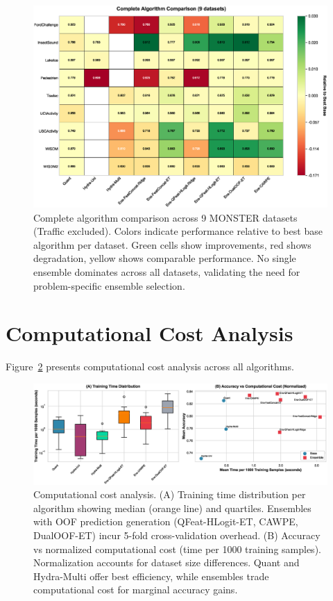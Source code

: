 \documentclass[pdflatex,sn-basic]{sn-jnl}           %
\theoremstyle{thmstyleone}%
\theoremstyle{thmstyletwo}%
\theoremstyle{thmstylethree}%
\begin{document}
\begin{appendices}
\begin{figure}[!htb]
\centering
\includegraphics[width=\textwidth]{figureA1_full_heatmap}
\caption{Complete algorithm comparison across 9 MONSTER datasets (Traffic excluded). Colors indicate performance relative to best base algorithm per dataset. Green cells show improvements, red shows degradation, yellow shows comparable performance. No single ensemble dominates across all datasets, validating the need for problem-specific ensemble selection.}\label{fig:full_heatmap}
\end{figure}

\clearpage

\section{Computational Cost Analysis}\label{appE}

Figure~\ref{fig:computational} presents computational cost analysis across all algorithms.

\begin{figure}[!htb]
\centering
\includegraphics[width=\textwidth]{figureA2_computational_cost}
\caption{Computational cost analysis. (A) Training time distribution per algorithm showing median (orange line) and quartiles. Ensembles with OOF prediction generation (QFeat-HLogit-ET, CAWPE, DualOOF-ET) incur 5-fold cross-validation overhead. (B) Accuracy vs normalized computational cost (time per 1000 training samples). Normalization accounts for dataset size differences. Quant and Hydra-Multi offer best efficiency, while ensembles trade computational cost for marginal accuracy gains.}\label{fig:computational}
\end{figure}


\end{appendices}
\end{document}
